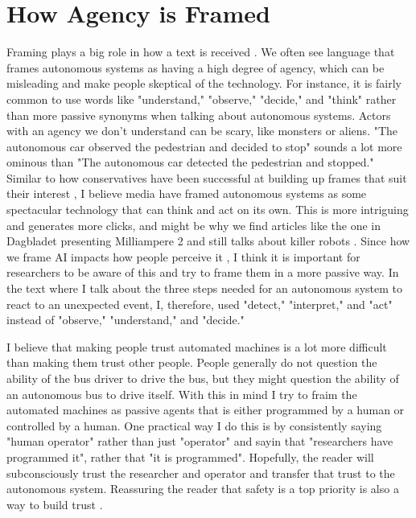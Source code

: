 \documentclass{iopconfser}
\begin{document}
\section*{How Agency is Framed}
Framing plays a big role in how a text is received \cite{lakoffWhyItMatters2010}\cite{gustafssonCognitiveLinguisticsScience2024}.
We often see language that frames autonomous systems as having a high degree of agency, which can be misleading and make people skeptical of the technology.
For instance, it is fairly common to use words like "understand," "observe," "decide," and "think" rather than more passive synonyms when talking about autonomous systems.
Actors with an agency we don't understand can be scary, like monsters or aliens.
"The autonomous car observed the pedestrian and decided to stop" sounds a lot more ominous than "The autonomous car detected the pedestrian and stopped."
Similar to how conservatives have been successful at building up frames that suit their interest \cite{lakoffWhyItMatters2010}, I believe media have framed autonomous systems as some spectacular technology that can think and act on its own.
This is more intriguing and generates more clicks, and might be why we find articles like the one in Dagbladet presenting Milliampere 2 and still talks about killer robots \cite{fjeldSelvstyrtFerjeVekker2022}.
Since how we frame AI impacts how people perceive it \cite{bingamanSiriShowMe2021}, I think it is important for researchers to be aware of this and try to frame them in a more passive way.
In the text where I talk about the three steps needed for an autonomous system to react to an unexpected event, I, therefore, used "detect," "interpret," and "act" instead of "observe," "understand," and "decide."

I believe that making people trust automated machines is a lot more difficult than making them trust other people.
People generally do not question the ability of the bus driver to drive the bus, but they might question the ability of an autonomous bus to drive itself.
With this in mind I try to fraim the automated machines as passive agents that is either programmed by a human or controlled by a human.
One practical way I do this is by consistently saying "human operator" rather than just "operator" and sayin that "researchers have programmed it", rather that "it is programmed".
Hopefully, the reader will subconsciously trust the researcher and operator and transfer that trust to the autonomous system.
Reassuring the reader that safety is a top priority is also a way to build trust \cite{kulykPeopleWantReassurance2023}.
\end{document}
